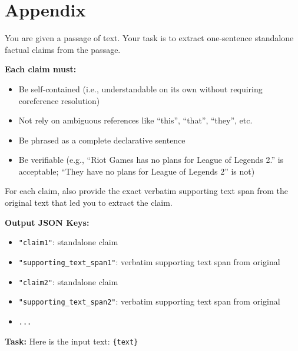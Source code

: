 \section*{Appendix}
\label{appendix:prompts}

\begin{tcolorbox}[
    colback=lightgray!20, 
    colframe=gray, 
    title={\textbf{Claim Extraction Prompt}}, 
    fonttitle=\bfseries,
    sharp corners=southwest,
    coltitle=black,
    label=prompt:p3
]
\small

You are given a passage of text. Your task is to extract one-sentence standalone factual claims from the passage.

\textbf{Each claim must:}
\begin{itemize}
    \item Be self-contained (i.e., understandable on its own without requiring coreference resolution)
    \item Not rely on ambiguous references like ``this'', ``that'', ``they'', etc.
    \item Be phrased as a complete declarative sentence
    \item Be verifiable (e.g., ``Riot Games has no plans for League of Legends 2.'' is acceptable; ``They have no plans for League of Legends 2'' is not)
\end{itemize}

For each claim, also provide the exact verbatim supporting text span from the original text that led you to extract the claim.

\vspace{0.01cm}
\textbf{Output JSON Keys:}
\begin{itemize}
    \item \texttt{"claim1"}: standalone claim
    \item \texttt{"supporting\_text\_span1"}: verbatim supporting text span from original
    \item \texttt{"claim2"}: standalone claim
    \item \texttt{"supporting\_text\_span2"}: verbatim supporting text span from original
    \item \texttt{...}
\end{itemize}

\vspace{0.01cm}
\textbf{Task:} \newline
Here is the input text: \texttt{\{text\}}

\end{tcolorbox}

